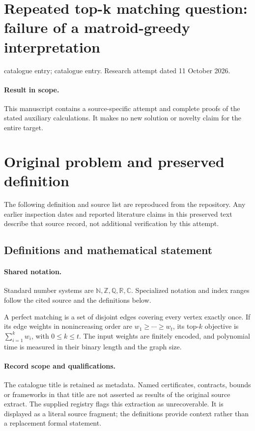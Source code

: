 \documentclass[11pt]{article}
\begin{document}
\section*{Repeated top-k matching question: failure of a matroid-greedy interpretation}
\noindent catalogue entry; catalogue entry. Research attempt dated 11 October 2026.
\paragraph{Result in scope.}This manuscript contains a source-specific attempt and complete proofs of the stated auxiliary calculations. It makes no new solution or novelty claim for the entire target.
\section{Original problem and preserved definition}
The following definition and source list are reproduced from the repository. Any earlier inspection dates and reported literature claims in this preserved text describe that source record, not additional verification by this attempt.
\subsection{Definitions and mathematical statement}

\paragraph{Shared notation.}Standard number systems are $\mathbb N,\mathbb Z,\mathbb Q,\mathbb R,\mathbb C$. Specialized notation and index ranges follow the cited source and the definitions below.


A perfect matching is a set of disjoint edges covering every vertex exactly once. If its edge weights in nonincreasing order are $w_1\geq\cdots\geq w_t$, its top-$k$ objective is $\sum_{i=1}^kw_i$, with $0\leq k\leq t$. The input weights are finitely encoded, and polynomial time is measured in their binary length and the graph size.
\paragraph{Record scope and qualifications.}
The catalogue title is retained as metadata. Named certificates, contracts, bounds or frameworks in that title are not asserted as results of the original source extract.
The supplied registry flags this extraction as unrecoverable. It is displayed as a literal source fragment; the definitions provide context rather than a replacement formal statement.
\end{document}
